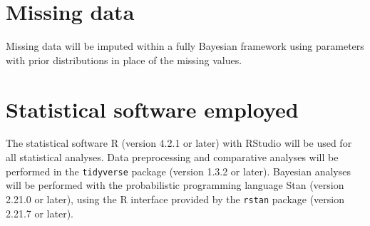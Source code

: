 \documentclass{article}
\begin{document}
\section{Missing data}

Missing data will be imputed within a fully Bayesian framework using parameters with prior distributions in place of the missing values. 

\section{Statistical software employed}

The statistical software R (version 4.2.1 or later) with RStudio will be used for all statistical analyses. Data preprocessing and comparative analyses will be performed in the \texttt{tidyverse} package (version 1.3.2 or later). Bayesian analyses will be performed with the probabilistic programming language Stan (version 2.21.0 or later), using the R interface provided by the \texttt{rstan} package (version 2.21.7 or later).



\end{document}
